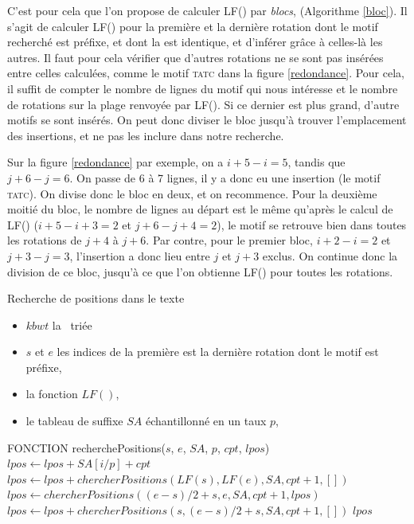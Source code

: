 C'est pour cela que l'on propose de calculer LF() par \textit{blocs}, (Algorithme \ref{bloc}). Il s'agit de calculer LF() pour la première et la dernière rotation dont le motif recherché est préfixe, et dont la \kbwt est identique, et d'inférer grâce à celles-là les autres. Il faut pour cela vérifier que d'autres rotations ne se sont pas insérées entre celles calculées, comme le motif \textsc{tatc} dans la figure \ref{redondance}. Pour cela, il suffit de compter le nombre de lignes du motif qui nous intéresse et le nombre de rotations sur la plage renvoyée par LF(). Si ce dernier est plus grand, d'autre motifs se sont insérés. On peut donc diviser le bloc jusqu'à trouver l'emplacement des insertions, et ne pas les inclure dans notre recherche.

Sur la figure \ref{redondance} par exemple, on a $i+5 - i = 5$, tandis que $j+6 - j = 6$. On passe de 6 à 7 lignes, il y a donc eu une insertion (le motif \textsc{tatc}). On divise donc le bloc en deux, et on recommence. Pour la deuxième moitié du bloc, le nombre de lignes au départ est le même qu'après le calcul de LF() ($i+5 - i+3 = 2$ et $j+6 - j+4 = 2$), le motif se retrouve bien dans toutes les rotations de $j+4$ à $j+6$. Par contre, pour le premier bloc, $i+2 - i = 2$ et $j+3 - j = 3$, l'insertion a donc lieu entre $j$ et $j+3$ exclus. On continue donc la division de ce bloc, jusqu'à ce que l'on obtienne LF() pour toutes les rotations.


\begin{algorithm}
\caption{Recherche de positions dans le texte}	
\label{bloc}	
	\begin{algorithmic}
	\REQUIRE 
		\begin{itemize}
			\item $kbwt$ la \kbwt\ triée
			\item $s$ et $e$ les indices de la première est la dernière rotation dont le motif est préfixe, 
			\item la fonction $LF()$, 
			\item le tableau de suffixe $SA$ échantillonné en un taux $p$, 
		\end{itemize}
	\STATE FONCTION recherchePositions($s$, $e$, $SA$, $p$, $cpt$, $lpos$) \\
		\STATE $lpos \gets lpos + SA[i/p] + cpt$
	\ENDFOR
		\STATE $lpos \gets lpos + chercherPositions(LF(s), LF(e), SA, cpt+1, [])$
	\ELSE
		\STATE $lpos \gets chercherPositions((e-s)/2 +s, e, SA, cpt+1, lpos)$
		\STATE $lpos \gets lpos + chercherPositions(s, (e-s)/2 +s, SA, cpt+1, [])$
	\ENDIF
	\RETURN $lpos$
	\end{algorithmic}
\end{algorithm}



